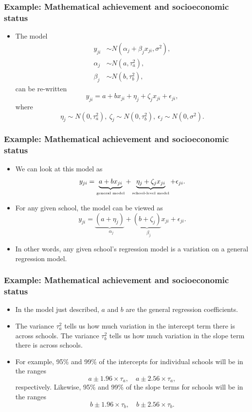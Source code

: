 \documentclass[10pt,xcolor=dvipsnames,serif,professionalfont]{beamer} %
\begin{document}
\begin{frame}
\frametitle{Example: Mathematical achievement and socioeconomic status}
\begin{itemize}
\item The model
\begin{align*}
y_{ji} &\sim N(\alpha_{j} + \beta_j x_{ji},\sigma^2),\\
\alpha_j &\sim N(a,\tau_a^2),\\
\beta_j &\sim N(b,\tau_b^2),
\end{align*}
can be re-written
\[y_{ji} = a + bx_{ji} + \eta_j + \zeta_j x_{ji} + \epsilon_{ji},\]
where 
\[\eta_j \sim N(0,\tau_a^2),~ \zeta_j \sim N(0,\tau_b^2),~ \epsilon_j \sim N(0,\sigma^2).\]
\end{itemize}
\end{frame}

\begin{frame}
\frametitle{Example: Mathematical achievement and socioeconomic status}
\begin{itemize}
\item We can look at this model as 
\[y_{ji} = \underbrace{a + bx_{ji}}_{\text{\tiny general model}} + \underbrace{\eta_j + \zeta_j x_{ji}}_{\text{\tiny school-level model}} + \epsilon_{ji}.\]
\item For any given school, the model can be viewed as 
\[y_{ji} = \underbrace{(a + \eta_j)}_{\text{ $\alpha_j$}} + \underbrace{(b + \zeta_j)}_{\text{ $\beta_j$}} x_{ji} + \epsilon_{ji}.\]
\item In other words, any given school's regression model is a variation on a general regression model.
\end{itemize}
\end{frame}

\begin{frame}
\frametitle{Example: Mathematical achievement and socioeconomic status}
\begin{itemize}
\item In the model just described, $a$ and $b$ are the general regression coefficients. 
\item The variance $\tau_a^2$ tells us how much variation in the intercept term there is across schools. The variance $\tau_b^2$ tells us how much variation in the slope term there is across schools. 
\item For example, 95\% and 99\% of the intercepts for individual schools will be in the ranges
\[a \pm 1.96 \times \tau_a,\quad  a \pm 2.56 \times \tau_a,\]
respectively. Likewise, 95\% and 99\% of the slope terms for schools will be in the ranges
\[ b \pm 1.96 \times \tau_b,\quad b  \pm 2.56 \times \tau_b.\]
\end{itemize}
\end{frame}
\end{document}
